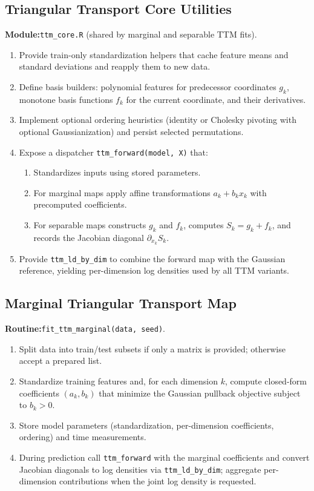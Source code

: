 \documentclass[11pt,a4paper,twoside]{book}\usepackage[]{graphicx}\usepackage[]{xcolor}
\begin{document}
\subsection{Triangular Transport Core Utilities}\label{app:ttm-core}

\textbf{Module:}\quad\texttt{ttm\_core.R} (shared by marginal and separable TTM fits).

\begin{enumerate}
  \item Provide train-only standardization helpers that cache feature means and standard deviations and reapply them to new data.
  \item Define basis builders: polynomial features for predecessor coordinates $g_k$, monotone basis functions $f_k$ for the current coordinate, and their derivatives.
  \item Implement optional ordering heuristics (identity or Cholesky pivoting with optional Gaussianization) and persist selected permutations.
  \item Expose a dispatcher \texttt{ttm\_forward(model, X)} that:
    \begin{enumerate}
      \item Standardizes inputs using stored parameters.
      \item For marginal maps apply affine transformations $a_k + b_k x_k$ with precomputed coefficients.
      \item For separable maps constructs $g_k$ and $f_k$, computes $S_k = g_k + f_k$, and records the Jacobian diagonal $\partial_{x_k} S_k$.
    \end{enumerate}
  \item Provide \texttt{ttm\_ld\_by\_dim} to combine the forward map with the Gaussian reference, yielding per-dimension log densities used by all TTM variants.
\end{enumerate}

\subsection{Marginal Triangular Transport Map}\label{app:ttm-marg}

\textbf{Routine:}\quad\texttt{fit\_ttm\_marginal(data, seed)}.

\begin{enumerate}
  \item Split data into train/test subsets if only a matrix is provided; otherwise accept a prepared list.
  \item Standardize training features and, for each dimension $k$, compute closed-form coefficients $(a_k, b_k)$ that minimize the Gaussian pullback objective subject to $b_k > 0$.
  \item Store model parameters (standardization, per-dimension coefficients, ordering) and time measurements.
  \item During prediction call \texttt{ttm\_forward} with the marginal coefficients and convert Jacobian diagonals to log densities via \texttt{ttm\_ld\_by\_dim}; aggregate per-dimension contributions when the joint log density is requested.
\end{enumerate}
\end{document}
